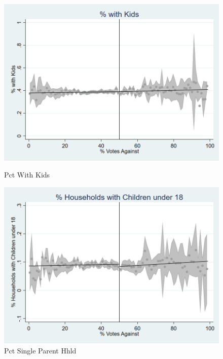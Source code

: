 \begin{figure}[ht]
    \begin{minipage}[b]{0.40\textwidth}
        \centering
        \includegraphics[width=\textwidth,keepaspectratio]{images/cov_smoothness_pctwithkids.png}
        \caption*{Pct With Kids}
        \label{fig:pct_with_kids_sm}
    \end{minipage}
    \hfill
    \begin{minipage}[b]{0.40\textwidth}
        \centering
        \includegraphics[width=\textwidth,keepaspectratio]{images/cov_smoothness_pctsinparhhld.png}
        \caption*{Pct Single Parent Hhld}
        \label{fig:pctsinparhhld_sm}
    \end{minipage}
    
    

\end{figure}
